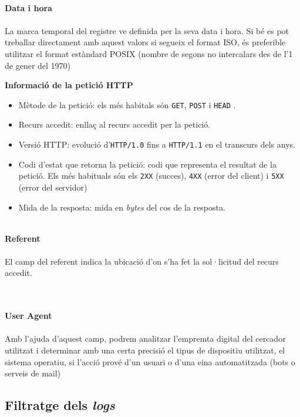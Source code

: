 \noindent \\
\textbf{Data i hora} \\ \\
La marca temporal del registre ve definida per la seva data i hora.
Si bé es pot treballar directament amb aquest valors si segueix el format \gls{ISO}, és preferible utilitzar el format estàndard \gls{POSIX} (nombre de segons no intercalars des de l'1 de gener del 1970)

\clearpage

\noindent
\textbf{Informació de la petició \gls{HTTP}}~\cite{http} \\

\begin{itemize}
    \item Mètode de la petició: els més habitals són \texttt{GET}, \texttt{POST} i \texttt{HEAD} .
    \item Recurs accedit: enllaç al recurs accedit per la petició.
    \item Versió \gls{HTTP}: evolució d'\texttt{HTTP/1.0} fins a \texttt{HTTP/1.1} en el transcurs dels anys.
    \item Codi d'estat que retorna la petició: codi que representa el resultat de la petició.
    Els més habituals són els \texttt{2XX} (succes), \texttt{4XX} (error del client) i \texttt{5XX} (error del servidor)
    \item Mida de la resposta: mida en \textit{bytes} del cos de la resposta.
\end{itemize}

\noindent \\
\textbf{Referent} \\ \\
El camp del referent indica la ubicació d’on s’ha fet la sol·licitud del recurs accedit.

\noindent \\ \\
\textbf{User Agent} \\ \\
Amb l’ajuda d’aquest camp, podrem analitzar l’empremta digital del cercador utilitzat i determinar amb una certa precisió el tipus de dispositiu utilitzat, el sistema operatiu, si l’acció prové d’un usuari o d’una eina automatitzada (bots o serveis de mail)

\clearpage

\subsection{Filtratge dels \textit{logs}}\label{subsec:log-filter}


